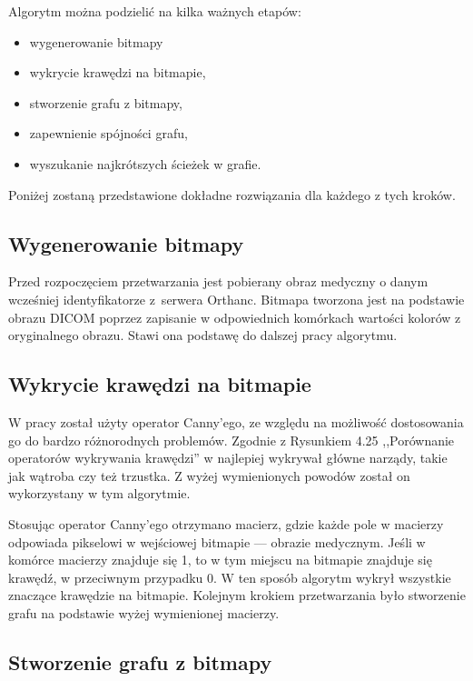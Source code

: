 \documentclass[a4paper,11pt,twoside,openright]{report}
\theoremstyle{definition}
\begin{document}
Algorytm można podzielić na kilka ważnych etapów:

\begin{itemize}[noitemsep]
\item {wygenerowanie bitmapy}
\item {wykrycie krawędzi na bitmapie,}
\item {stworzenie grafu z bitmapy,}
\item {zapewnienie spójności grafu,}
\item {wyszukanie najkrótszych ścieżek w grafie.}
\end{itemize}

Poniżej zostaną przedstawione dokładne rozwiązania dla każdego z tych kroków.

\subsection {Wygenerowanie bitmapy}

Przed rozpoczęciem przetwarzania jest pobierany obraz medyczny o danym wcześniej
identyfikatorze z~serwera Orthanc. Bitmapa tworzona jest na podstawie obrazu DICOM poprzez
zapisanie w odpowiednich komórkach wartości kolorów z oryginalnego obrazu.
Stawi ona podstawę do dalszej pracy algorytmu.

\subsection {Wykrycie krawędzi na bitmapie}

W pracy został użyty operator Canny'ego, ze względu na możliwość dostosowania go
do bardzo różnorodnych problemów. Zgodnie z Rysunkiem 4.25 %
,,Porównanie operatorów wykrywania krawędzi'' w \cite{Cyfrowe przetwarzanie obrazów medycznych}
najlepiej wykrywał główne narządy, takie jak wątroba czy też trzustka. Z wyżej
wymienionych powodów został on wykorzystany w tym algorytmie.

Stosując operator Canny'ego otrzymano macierz, gdzie każde pole w macierzy odpowiada pikselowi
w wejściowej bitmapie --- obrazie medycznym. Jeśli w komórce macierzy znajduje
się 1, to w tym miejscu na bitmapie znajduje się krawędź, w przeciwnym przypadku
0. W ten sposób algorytm wykrył wszystkie znaczące krawędzie na bitmapie. Kolejnym
krokiem przetwarzania było stworzenie grafu na podstawie wyżej wymienionej macierzy.

\subsection {Stworzenie grafu z bitmapy}
\end{document}
